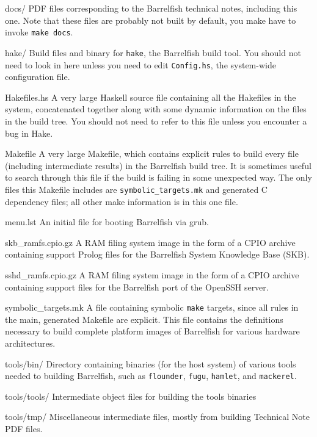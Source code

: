 \documentclass[a4paper,twoside]{report} %
\begin{document}
\begin{dirlist}
\item[docs/] PDF files corresponding to the Barrelfish technical
  notes, including this one.  Note that these files are probably not
  built by default, you make have to invoke \texttt{make docs}. 
\item[hake/] Build files and binary for \texttt{hake}, the Barrelfish
  build tool.  You should not need to look in here unless you need to
  edit \texttt{Config.hs}, the system-wide configuration file.
\item[Hakefiles.hs] A very large Haskell source file containing all
  the Hakefiles in the system, concatenated together along with some
  dynamic information on the files in the build tree.  You should not
  need to refer to this file unless you encounter a bug in Hake.
\item[Makefile] A very large Makefile, which contains explicit rules
  to build every file (including intermediate results) in the
  Barrelfish build tree.  It is sometimes useful to search through
  this file if the build is failing in some unexpected way.  The only
  files this Makefile includes are \texttt{symbolic\_targets.mk} and
  generated C dependency files; all other make information is in this
  one file.
\item[menu.lst] An initial file for booting Barrelfish via grub. 
\item[skb\_ramfs.cpio.gz] A RAM filing system image in the form of a
  CPIO archive containing support Prolog files for the Barrelfish
  System Knowledge Base (SKB). 
\item[sshd\_ramfs.cpio.gz]  A RAM filing system image in the form of a
  CPIO archive containing support files for the Barrelfish port of the
  OpenSSH server.
\item[symbolic\_targets.mk] A file containing symbolic \texttt{make}
  targets, since all rules in the main, generated Makefile are
  explicit.  This file contains the definitions necessary to build
  complete platform images of Barrelfish for various hardware
  architectures. 
\item[tools/bin/] Directory containing binaries (for the host system)
  of various tools needed to building Barrelfish, such as
  \texttt{flounder}, \texttt{fugu}, \texttt{hamlet}, and
  \texttt{mackerel}.
\item[tools/tools/] Intermediate object files for building the tools
  binaries
\item[tools/tmp/] Miscellaneous intermediate files, mostly from
  building Technical Note PDF files.
\end{dirlist}
\end{document}
